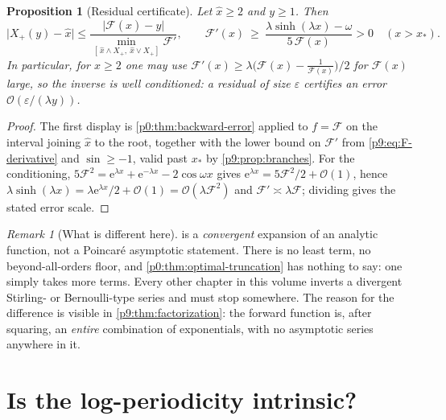 \documentclass[11pt,a4paper,oneside]{book}
\theoremstyle{plain}
\newtheorem{proposition}[theorem]{Proposition}
\theoremstyle{definition}
\theoremstyle{remark}
\newtheorem{remark}[theorem]{Remark}
\newcommand{\e}{\mathrm{e}}
\newcommand{\bigO}{\mathcal{O}}
\begin{document}
\begin{proposition}[Residual certificate]\label{p9:prop:certificate}
Let $\widehat x\ge2$ and $y\ge1$.  Then
\begin{equation}\label{p9:eq:certificate}
 \bigl|X_+(y)-\widehat x\bigr|
 \le\frac{\bigl|\mathcal{F}(\widehat x)-y\bigr|}
 {\displaystyle\min_{[\,\widehat x\wedge X_+,\ \widehat x\vee X_+]}\mathcal{F}'}
 ,
 \qquad
 \mathcal{F}'(x)\ \ge\
 \frac{\lambda\sinh(\lambda x)-\omega}{5\,\mathcal{F}(x)}>0
 \quad(x>x_{*}).
\end{equation}
In particular, for $x\ge2$ one may use
$\mathcal{F}'(x)\ge\lambda\bigl(\mathcal{F}(x)-\tfrac1{\mathcal{F}(x)}\bigr)/2$
for $\mathcal{F}(x)$ large, so the inverse is well conditioned: a residual of
size $\varepsilon$ certifies an error $\bigO(\varepsilon/(\lambda y))$.
\end{proposition}

\begin{proof}
The first display is \cref{p0:thm:backward-error} applied to
$f=\mathcal{F}$ on the interval joining $\widehat x$ to the root, together
with the lower bound on $\mathcal{F}'$ from \eqref{p9:eq:F-derivative} and
$\sin\ge-1$, valid past $x_{*}$ by \cref{p9:prop:branches}.  For the
conditioning, $5\mathcal{F}^{2}=\e^{\lambda x}+\e^{-\lambda x}-2\cos\omega x$
gives $\e^{\lambda x}=5\mathcal{F}^{2}/2+\bigO(1)$, hence
$\lambda\sinh(\lambda x)=\lambda\e^{\lambda x}/2+\bigO(1)
=\bigO(\lambda\mathcal{F}^{2})$ and
$\mathcal{F}'\asymp\lambda\mathcal{F}$; dividing gives the stated error scale.
\end{proof}

\begin{remark}[What is different here]\label{p9:rem:convergent}
 is a \emph{convergent} expansion of an analytic function,
not a Poincar\'e asymptotic statement.  There is no least term, no
beyond-all-orders floor, and \cref{p0:thm:optimal-truncation} has nothing to
say: one simply takes more terms.  Every other chapter in this volume inverts
a divergent Stirling- or Bernoulli-type series and must stop somewhere.  The
reason for the difference is visible in \cref{p9:thm:factorization}: the
forward function is, after squaring, an \emph{entire} combination of
exponentials, with no asymptotic series anywhere in it.
\end{remark}

\section{Is the log-periodicity intrinsic?}
\label{p9:sec:intrinsic}
\end{document}
